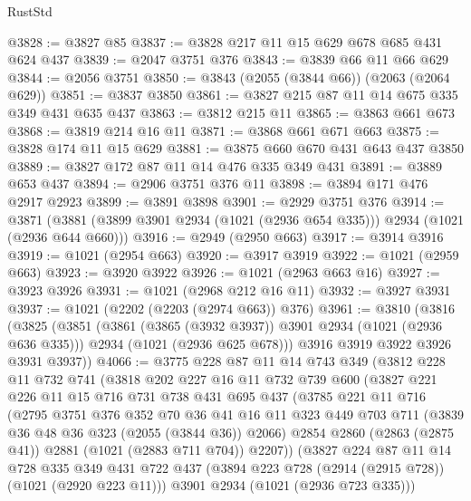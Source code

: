 \begin{lexlean}{RustStd}
\begin{coremodule}
@3828 := @3827 @85
@3837 := @3828 @217 @11 @15 @629 @678 @685 @431 @624 @437
@3839 := @2047 @3751 @376
@3843 := @3839 @66 @11 @66 @629
@3844 := @2056 @3751
@3850 := @3843 (@2055 (@3844 @66)) (@2063 (@2064 @629))
@3851 := @3837 @3850
@3861 := @3827 @215 @87 @11 @14 @675 @335 @349 @431 @635 @437
@3863 := @3812 @215 @11
@3865 := @3863 @661 @673
@3868 := @3819 @214 @16 @11
@3871 := @3868 @661 @671 @663
@3875 := @3828 @174 @11 @15 @629
@3881 := @3875 @660 @670 @431 @643 @437 @3850
@3889 := @3827 @172 @87 @11 @14 @476 @335 @349 @431
@3891 := @3889 @653 @437
@3894 := @2906 @3751 @376 @11
@3898 := @3894 @171 @476 @2917 @2923
@3899 := @3891 @3898
@3901 := @2929 @3751 @376
@3914 := @3871 (@3881 (@3899 @3901 @2934 (@1021 (@2936 @654 @335))) @2934 (@1021 (@2936 @644 @660)))
@3916 := @2949 (@2950 @663)
@3917 := @3914 @3916
@3919 := @1021 (@2954 @663)
@3920 := @3917 @3919
@3922 := @1021 (@2959 @663)
@3923 := @3920 @3922
@3926 := @1021 (@2963 @663 @16)
@3927 := @3923 @3926
@3931 := @1021 (@2968 @212 @16 @11)
@3932 := @3927 @3931
@3937 := @1021 (@2202 (@2203 (@2974 @663)) @376)
@3961 := @3810
    (@3816
      (@3825
        (@3851
          (@3861 (@3865 (@3932 @3937)) @3901 @2934 (@1021 (@2936 @636 @335)))
          @2934
          (@1021 (@2936 @625 @678)))
        @3916
        @3919
        @3922
        @3926
        @3931
        @3937))
@4066 := @3775
    @228
    @87
    @11
    @14
    @743
    @349
    (@3812
      @228
      @11
      @732
      @741
      (@3818
        @202
        @227
        @16
        @11
        @732
        @739
        @600
        (@3827
          @221
          @226
          @11
          @15
          @716
          @731
          @738
          @431
          @695
          @437
          (@3785
            @221
            @11
            @716
            (@2795
              @3751
              @376
              @352
              @70
              @36
              @41
              @16
              @11
              @323
              @449
              @703
              @711
              (@3839 @36 @48 @36 @323 (@2055 (@3844 @36)) @2066)
              @2854
              @2860
              (@2863 (@2875 @41))
              @2881
              (@1021 (@2883 @711 @704))
              @2207))
          (@3827
            @224
            @87
            @11
            @14
            @728
            @335
            @349
            @431
            @722
            @437
            (@3894 @223 @728 (@2914 (@2915 @728)) (@1021 (@2920 @223 @11)))
            @3901
            @2934
            (@1021 (@2936 @723 @335)))

\end{coremodule}
\end{lexlean}
